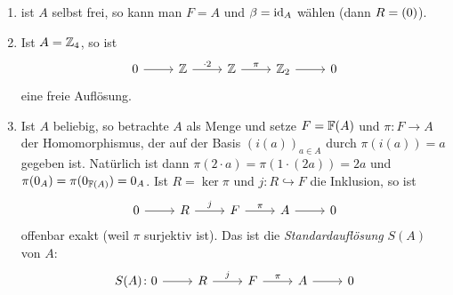 \begin{beispiel}
  \begin{enumerate}
    \item
      ist $A$ selbst frei, so kann man $F = A$ und $\beta = \operatorname{id}_A$ wählen (dann $R = (0)$).
    \item
      Ist $A = \mathbb{Z}_4$, so ist
      \begin{equation*}
        \begin{tikzcd}
          0 \arrow{r}{}
            & \Z \arrow{r}{\cdot 2}
            & \Z \arrow{r}{\pi}
            & \Z_2 \arrow {r}{}
            & 0
        \end{tikzcd}
      \end{equation*}
      eine freie Auflösung.
    \item
      Ist $A$ beliebig, so betrachte $A$ als Menge und setze $F = \mathbb{F}(A)$ und $\pi\colon F \to A$ der Homomorphismus, der auf der Basis ${(i(a))}_{a \in A}$ durch $\pi(i(a)) = a$ gegeben ist.
      Natürlich ist dann $\pi(2 \cdot a) = \pi(1\cdot (2a)) = 2a$ und $\pi(0_A) = \pi(0_{\mathbb{F}(A)}) = 0_A$.
      Ist $R = \ker \pi$ und $j\colon R \hookrightarrow F$ die Inklusion, so ist
      \begin{equation*}
        \begin{tikzcd}
          0 \arrow{r}{}
            & R \arrow{r}{j}
            & F \arrow{r}{\pi}
            & A \arrow{r}{}
            & 0
        \end{tikzcd}
      \end{equation*}
      offenbar exakt (weil $\pi$ surjektiv ist).
      Das ist die \emph{Standardauflösung} $S(A)$ von $A$:
      \begin{equation*}
        \begin{tikzcd}
          S(A)\colon
          0 \arrow{r}{}
            & R \arrow{r}{j}
            & F \arrow{r}{\pi}
            & A \arrow{r}{}
            & 0
        \end{tikzcd}
      \end{equation*}
  \end{enumerate}
\end{beispiel}
